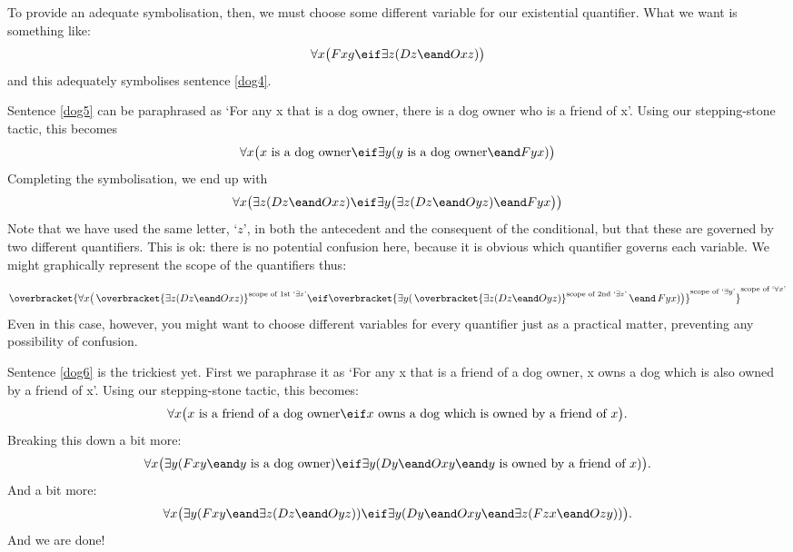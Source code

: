 To provide an adequate symbolisation, then, we must choose some different variable for our existential quantifier. What we want is something like:
$$\forall x\bigl(Fxg \eif\exists z(Dz \eand Oxz) \bigr)$$
and this adequately symbolises sentence \ref{dog4}.

Sentence \ref{dog5} can be paraphrased as `For any x that is a dog owner, there is a dog owner who is a friend of x'. Using our stepping-stone tactic, this becomes 
$$\forall x\bigl(\mbox{$x$ is a dog owner}\eif\exists y(\mbox{$y$ is a dog owner}\eand Fyx) \bigr)$$
Completing the symbolisation, we end up with
$$\forall x\bigl(\exists z(Dz \eand Oxz)\eif\exists y\bigl(\exists z(Dz \eand Oyz)\eand Fyx\bigr) \bigr)$$
Note that we have used the same letter, `$z$', in both the antecedent and the consequent of the conditional, but that these are governed by two different quantifiers. This is ok: there is no potential confusion here, because it is obvious which quantifier governs each variable. We might graphically represent the scope of the quantifiers thus:


$$\overbracket{\forall x\bigl(\,\overbracket{\exists z(Dz \eand Oxz)}^{\text{scope of 1st `}\exists z\text{'}}\eif \overbracket{\exists y(\,\overbracket{\exists z(Dz \eand Oyz)}^{\text{scope of 2nd `}\exists z\text{'}}\mathop{\eand} Fyx) \bigr)}^{\text{scope of `}\exists y\text{'}}}^{\text{scope of `}\forall x\text{'}}$$
Even in this case, however, you might want to choose different variables for every quantifier just as a practical matter, preventing any possibility of confusion. 

Sentence \ref{dog6} is the trickiest yet. First we paraphrase it as `For any x that is a friend of a dog owner, x owns a dog which is also owned by a friend of x'. Using our stepping-stone tactic, this becomes:
$$\forall x\bigl(x\text{ is a friend of a dog owner}\eif x\text{ owns a dog which is owned by a friend of }x\bigr).$$
Breaking this down a bit more:
$$\forall x\bigl(\exists y(Fxy \eand y\text{ is a dog owner})\eif \exists y(Dy \eand Oxy \eand y\text{ is owned by a friend of }x) \bigr).$$
And a bit more: 
$$\forall x\bigl(\exists y(Fxy \eand \exists z(Dz \eand Oyz)) \eif \exists y(Dy \eand Oxy \eand \exists z(Fzx \eand Ozy)) \bigr).$$
And we are done!



